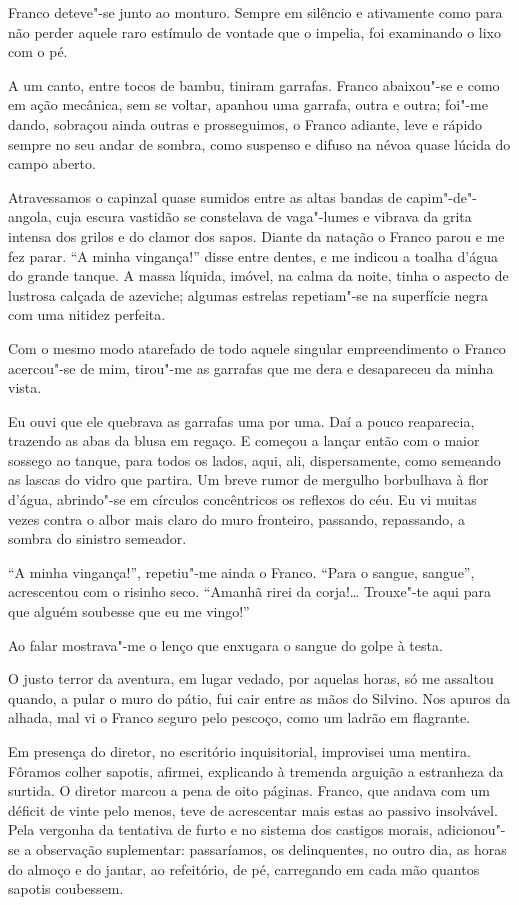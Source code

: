 Franco deteve"-se junto ao
monturo. Sempre em silêncio e ativamente como para não perder aquele
raro estímulo de vontade que o impelia, foi examinando o lixo com o pé.

A um canto, entre tocos de bambu, tiniram garrafas. Franco abaixou"-se
e como em ação mecânica, sem se voltar, apanhou uma garrafa, outra e
outra; foi"-me dando, sobraçou ainda outras e prosseguimos, o Franco
adiante, leve e rápido sempre no seu andar de sombra, como suspenso e
difuso na névoa quase lúcida do campo aberto. 

Atravessamos o capinzal
quase sumidos entre as altas bandas de capim"-de"-angola, cuja escura
vastidão se constelava de vaga"-lumes e vibrava da grita intensa dos
grilos e do clamor dos sapos. Diante da natação o Franco parou e me fez
parar. ``A minha vingança!'' disse entre dentes, e me indicou a toalha
d'água do grande tanque. A massa líquida, imóvel, na calma da noite,
tinha o aspecto de lustrosa calçada de azeviche; algumas estrelas
repetiam"-se na superfície negra com uma nitidez perfeita. 

Com o mesmo
modo atarefado de todo aquele singular empreendimento o Franco
acercou"-se de mim, tirou"-me as garrafas que me dera e desapareceu
da minha vista. 

Eu ouvi que ele quebrava as garrafas uma por uma. Daí a
pouco reaparecia, trazendo as abas da blusa em regaço. E começou a
lançar então com o maior sossego ao tanque, para todos os lados, aqui,
ali, dispersamente, como semeando as lascas do vidro que partira. Um
breve rumor de mergulho borbulhava à flor d'água, abrindo"-se em
círculos concêntricos os reflexos do céu. Eu vi muitas vezes contra o
albor mais claro do muro fronteiro, passando, repassando, a sombra do
sinistro semeador. 

``A minha vingança!'', repetiu"-me ainda o Franco.
``Para o sangue, sangue'', acrescentou com o risinho seco. ``Amanhã rirei
da corja!\ldots{} Trouxe"-te aqui para que alguém soubesse que eu me vingo!'' 

Ao falar mostrava"-me o lenço que enxugara o sangue do golpe à testa. 

O justo terror da aventura, em lugar vedado, por aquelas horas,
só me assaltou quando, a pular o muro do pátio, fui cair entre as mãos
do Silvino. Nos apuros da alhada, mal vi o Franco seguro pelo pescoço,
como um ladrão em flagrante. 

Em presença do diretor, no escritório
inquisitorial, improvisei uma mentira. Fôramos colher sapotis, afirmei,
explicando à tremenda arguição a estranheza da surtida. O diretor
marcou a pena de oito páginas. Franco, que andava com um déficit de
vinte pelo menos, teve de acrescentar mais estas ao passivo insolvável.
Pela vergonha da tentativa de furto e no sistema dos castigos morais,
adicionou"-se a observação suplementar: passaríamos, os delinquentes, no
outro dia, as horas do almoço e do jantar, ao refeitório, de pé, 
carregando em cada mão quantos sapotis coubessem. 


